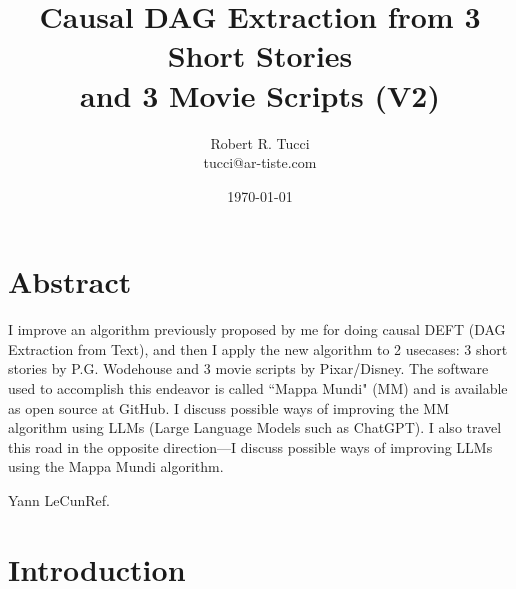 \documentclass[12pt]{article}
\begin{document}
\title{Causal DAG Extraction from 3 Short Stories  \\
and 3 Movie Scripts (V2)}
\date{ \today}
\author{Robert R. Tucci\\
        tucci@ar-tiste.com}
\maketitle
\vskip2cm
\section*{Abstract}
I improve an algorithm previously
proposed by me 
for doing causal DEFT (DAG Extraction from Text), and then I apply the new algorithm to 2 usecases:
3 short stories by P.G. Wodehouse and 3 movie scripts by Pixar/Disney. The software  used to accomplish this 
endeavor is called ``Mappa Mundi" (MM) and is available as open source at
GitHub.
I discuss possible ways of improving the MM algorithm
using LLMs (Large
Language Models such as ChatGPT).
I also travel this road in the opposite direction---I discuss possible ways of improving
LLMs using the Mappa Mundi algorithm.
\newpage

{Yann LeCun}{Ref.\cite{yann-religion}}

\section{Introduction}
\end{document}
